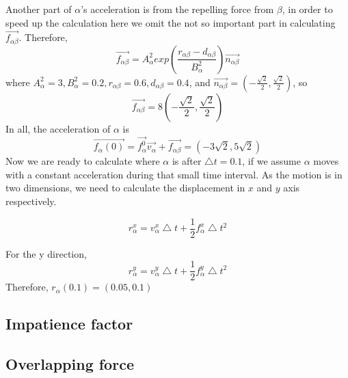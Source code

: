 Another part of $\alpha$'s acceleration is from the repelling force from $\beta$, in order to speed  up the calculation here we omit the not so important part in calculating $\overrightarrow{f_{\alpha \beta}}$.
Therefore,
 \begin{equation}
 \overrightarrow{f_{\alpha \beta}} = A^{2}_{\alpha} exp(\frac{r_{\alpha\beta}-d_{\alpha\beta}}{B^{2}_{\alpha}})\overrightarrow{n_{\alpha \beta}}
 \end{equation}
where $A^{2}_{\alpha}=3, B^{2}_{\alpha}=0.2, r_{\alpha\beta}=0.6, d_{\alpha\beta}=0.4$, and $\overrightarrow{n_{\alpha \beta}}=(-\frac{\sqrt{2}}{2}, \frac{\sqrt{2}}{2})$,
so 
 \begin{equation}
 \overrightarrow{f_{\alpha \beta}} = 8(-\frac{\sqrt{2}}{2}, \frac{\sqrt{2}}{2})
 \end{equation}
In all, the acceleration of $\alpha$ is 
 \begin{equation}
 \overrightarrow{f_{\alpha}(0)} = \overrightarrow{f^{0}_{\alpha}}\overrightarrow{v_{\alpha}} + \overrightarrow{f_{\alpha\beta}} = (-3\sqrt{2}, 5\sqrt{2})
 \end{equation}
Now we are ready to calculate where $\alpha$ is after $\bigtriangleup t=0.1$, if we assume $\alpha$ moves with a constant acceleration during that small time interval.
As the motion is in two dimensions, we need to calculate the displacement in $x$ and $y$ axis respectively.

 \begin{equation}
 r^{x}_{\alpha} = v^{x}_{\alpha} \bigtriangleup t + \frac{1}{2} f^{x}_{\alpha} \bigtriangleup t ^{2}
 \end{equation}
 
 For the y direction,
  \begin{equation}
 r^{y}_{\alpha} = v^{y}_{\alpha} \bigtriangleup t + \frac{1}{2} f^{y}_{\alpha} \bigtriangleup t ^{2}
 \end{equation}
 Therefore, $r_{\alpha}(0.1)= (0.05, 0.1)$
\subsection{Impatience factor}

\subsection{Overlapping force}
